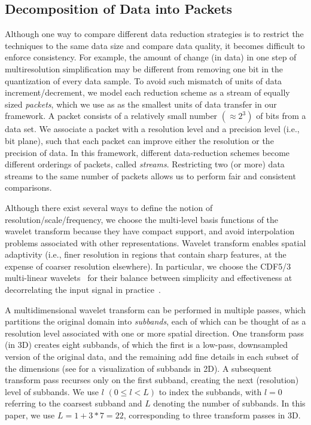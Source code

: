 \subsection{Decomposition of Data into Packets} \label{sec:data-streaming-framework}

Although one way to compare different data reduction strategies is to restrict the techniques to the
same data size and compare data quality, it becomes difficult to enforce consistency. For example,
the amount of change (in data) in one step of multiresolution simplification may be different from
removing one bit in the quantization of every data sample. To avoid such mismatch of units of data
increment/decrement, we model each reduction scheme as a stream of equally sized \emph{packets},
which we use as as the smallest units of data transfer in our framework. A packet consists of a
relatively small number $\left(\approx 2^3\right)$ of bits from a data set. We associate a packet with a 
resolution level and a
precision level (i.e., bit plane), such that each packet can improve either the resolution or the
precision of data.  
In this framework, different data-reduction schemes become different orderings
of packets, called \emph{streams}. Restricting two (or more) data streams to the same number of
packets allows us to perform fair and consistent comparisons.

Although there exist several ways to define the
notion of resolution/scale/frequency, we choose the multi-level basis functions of the wavelet transform 
because they have compact support, and avoid interpolation problems associated with other representations.
Wavelet transform enables spatial adaptivity (i.e., finer resolution in regions that
contain sharp features, at the expense of coarser resolution elsewhere). In particular, we choose
the CDF5/3 multi-linear wavelets~\cite{cdf-wavelets} for their balance between simplicity and
effectiveness at decorrelating the input signal in practice~\cite{jpeg2000}.

A multidimensional wavelet transform can be performed in multiple passes, which partitions the
original domain into \emph{subbands}, each of which can be thought of as a 
resolution level associated with one or more spatial direction. One
transform pass (in 3D) creates eight subbands, of which the first is a low-pass, downsampled version
of the original data, and the remaining add fine details in each subset of the dimensions (see
 for a visualization of subbands in 2D). A subsequent transform pass recurses
only on the first subband, creating the next (resolution) level of subbands. We use $l$ $(0 \leq l <
L)$ to index the subbands, with $l = 0$ referring to the coarsest subband and $L$ denoting the
number of subbands. In this paper, we use $L=1 + 3*7=22$, corresponding to three transform passes in 3D.

